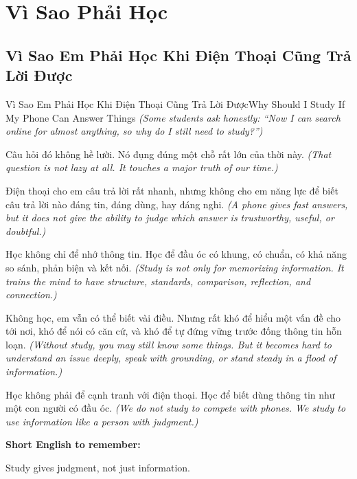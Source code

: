 \chapter{Vì Sao Phải Học}

\section{Vì Sao Em Phải Học Khi Điện Thoại Cũng Trả Lời Được}
\begin{truyen}{Vì Sao Em Phải Học Khi Điện Thoại Cũng Trả Lời Được}{Why Should I Study If My Phone Can Answer Things}
\textit{(Some students ask honestly: “Now I can search online for almost anything, so why do I still need to study?”)}

Câu hỏi đó không hề lười. Nó đụng đúng một chỗ rất lớn của thời này.
\textit{(That question is not lazy at all. It touches a major truth of our time.)}

Điện thoại cho em câu trả lời rất nhanh, nhưng không cho em năng lực để biết câu trả lời nào đáng tin, đáng dùng, hay đáng nghi.
\textit{(A phone gives fast answers, but it does not give the ability to judge which answer is trustworthy, useful, or doubtful.)}

Học không chỉ để nhớ thông tin. Học để đầu óc có khung, có chuẩn, có khả năng so sánh, phản biện và kết nối.
\textit{(Study is not only for memorizing information. It trains the mind to have structure, standards, comparison, reflection, and connection.)}

Không học, em vẫn có thể biết vài điều. Nhưng rất khó để hiểu một vấn đề cho tới nơi, khó để nói có căn cứ, và khó để tự đứng vững trước đống thông tin hỗn loạn.
\textit{(Without study, you may still know some things. But it becomes hard to understand an issue deeply, speak with grounding, or stand steady in a flood of information.)}
\end{truyen}

\begin{baihoc}
Học không phải để cạnh tranh với điện thoại. Học để biết dùng thông tin như một con người có đầu óc.
\textit{(We do not study to compete with phones. We study to use information like a person with judgment.)}
\end{baihoc}

\begin{ghinhoanh}
\textbf{Short English to remember:}

Study gives judgment, not just information.

\end{ghinhoanh}

